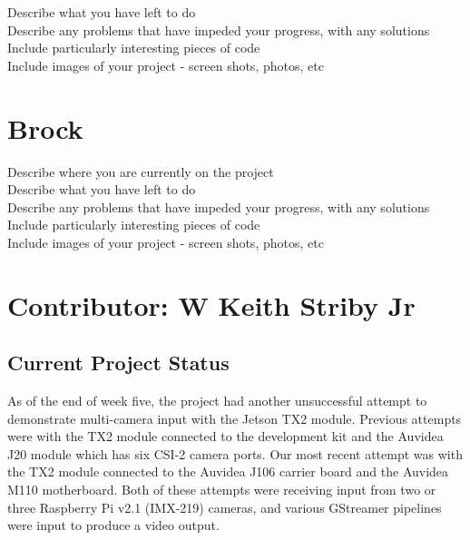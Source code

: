 \documentclass[letterpaper,10pt,serif,draftclsnofoot,onecolumn,compsoc,titlepage]{IEEEtran}
\begin{document}
Describe what you have left to do \\

Describe any problems that have impeded your progress, with any solutions \\

Include particularly interesting pieces of code \\

Include images of your project - screen shots, photos, etc \\

\section{Brock}
Describe where you are currently on the project \\

Describe what you have left to do \\

Describe any problems that have impeded your progress, with any solutions \\

Include particularly interesting pieces of code \\

Include images of your project - screen shots, photos, etc \\


\section{Contributor: W Keith Striby Jr}

\subsection{Current Project Status}

As of the end of week five, the project had another unsuccessful attempt to demonstrate 
multi-camera input with the Jetson TX2 module. Previous attempts were with the TX2 module
connected to the development kit and the Auvidea J20 module which has six CSI-2 camera 
ports. Our most recent attempt was with the TX2 module connected to the Auvidea J106 
carrier board and the Auvidea M110 motherboard. Both of these attempts were receiving 
input from two or three Raspberry Pi v2.1 (IMX-219) cameras, and various GStreamer 
pipelines were input to produce a video output. \\
\end{document}
